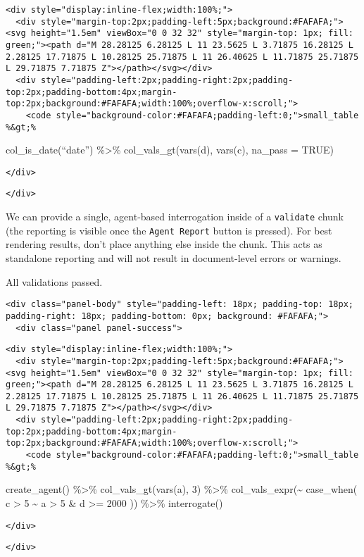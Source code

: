 \documentclass[
]{article}
\begin{document}
\begin{verbatim}
<div style="display:inline-flex;width:100%;">
  <div style="margin-top:2px;padding-left:5px;background:#FAFAFA;"><svg height="1.5em" viewBox="0 0 32 32" style="margin-top: 1px; fill: green;"><path d="M 28.28125 6.28125 L 11 23.5625 L 3.71875 16.28125 L 2.28125 17.71875 L 10.28125 25.71875 L 11 26.40625 L 11.71875 25.71875 L 29.71875 7.71875 Z"></path></svg></div>
  <div style="padding-left:2px;padding-right:2px;padding-top:2px;padding-bottom:4px;margin-top:2px;background:#FAFAFA;width:100%;overflow-x:scroll;">
    <code style="background-color:#FAFAFA;padding-left:0;">small_table %&gt;% 
\end{verbatim}

col\_is\_date(``date'') \%\textgreater\% col\_vals\_gt(vars(d), vars(c),
na\_pass = TRUE)

\begin{verbatim}
</div>
\end{verbatim}

\begin{verbatim}
</div>
\end{verbatim}

We can provide a single, agent-based interrogation inside of a
\texttt{validate} chunk (the reporting is visible once the
\texttt{Agent\ Report} button is pressed). For best rendering results,
don't place anything else inside the chunk. This acts as standalone
reporting and will not result in document-level errors or warnings.

{All validations passed.}

\hypertarget{chunk-3701207}{}
\begin{verbatim}
<div class="panel-body" style="padding-left: 18px; padding-top: 18px; padding-right: 18px; padding-bottom: 0px; background: #FAFAFA;">
  <div class="panel panel-success">
\end{verbatim}

\begin{verbatim}
<div style="display:inline-flex;width:100%;">
  <div style="margin-top:2px;padding-left:5px;background:#FAFAFA;"><svg height="1.5em" viewBox="0 0 32 32" style="margin-top: 1px; fill: green;"><path d="M 28.28125 6.28125 L 11 23.5625 L 3.71875 16.28125 L 2.28125 17.71875 L 10.28125 25.71875 L 11 26.40625 L 11.71875 25.71875 L 29.71875 7.71875 Z"></path></svg></div>
  <div style="padding-left:2px;padding-right:2px;padding-top:2px;padding-bottom:4px;margin-top:2px;background:#FAFAFA;width:100%;overflow-x:scroll;">
    <code style="background-color:#FAFAFA;padding-left:0;">small_table %&gt;%
\end{verbatim}

create\_agent() \%\textgreater\% col\_vals\_gt(vars(a), 3)
\%\textgreater\% col\_vals\_expr(\textasciitilde{} case\_when( c
\textgreater{} 5 \textasciitilde{} a \textgreater{} 5 \& d \textgreater=
2000 )) \%\textgreater\% interrogate()

\begin{verbatim}
</div>
\end{verbatim}

\begin{verbatim}
</div>
\end{verbatim}
\end{document}
